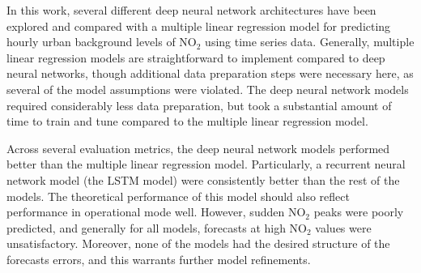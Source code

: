 



In this work, several different deep neural network architectures have been explored and compared with a multiple linear regression model for predicting hourly urban background levels of NO$_2$ using time series data. Generally, multiple linear regression models are straightforward to implement compared to deep neural networks, though additional data preparation steps were necessary here, as several of the model assumptions were violated. The deep neural network models required considerably less data preparation, but took a substantial amount of time to train and tune compared to the multiple linear regression model. 

Across several evaluation metrics, the deep neural network models performed better than the multiple linear regression model. Particularly, a recurrent neural network model (the LSTM model) were consistently better than the rest of the models. The theoretical performance of this model should also reflect performance in operational mode well. However, sudden NO$_2$ peaks were poorly predicted, and generally for all models, forecasts at high NO$_2$ values were unsatisfactory. Moreover, none of the models had the desired structure of the forecasts errors, and this warrants further model refinements. 



 
